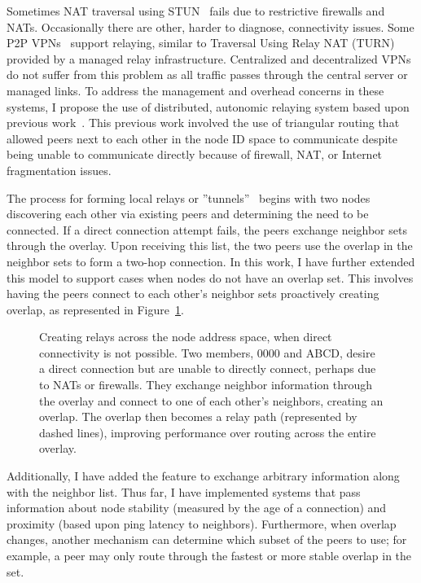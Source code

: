 Sometimes NAT traversal using STUN~\cite{stun} fails due to restrictive
firewalls and NATs.  Occasionally there are other, harder to diagnose,
connectivity issues.  Some P2P VPNs~\cite{hamachi, gbridge} support relaying,
similar to Traversal Using Relay NAT (TURN)~\cite{turn} provided by a managed
relay infrastructure.  Centralized and decentralized VPNs do not suffer from
this problem as all traffic passes through the central server or managed links.
To address the management and overhead concerns in these systems, I propose the
use of distributed, autonomic relaying system based upon previous
work~\cite{hpdc08_0,epost}.  This previous work involved the use of triangular
routing that allowed peers next to each other in the node ID space to
communicate despite being unable to communicate directly because of firewall,
NAT, or Internet fragmentation issues.

The process for forming local relays or ''tunnels''~\cite{hpdc08_0} begins with
two nodes discovering each other via existing peers and determining the need to
be connected.  If a direct connection attempt fails, the peers exchange
neighbor sets through the overlay.  Upon receiving this list, the two peers use
the overlap in the neighbor sets to form a two-hop connection.  In this work, I
have further extended this model to support cases when nodes do not have an
overlap set.  This involves having the peers connect to each other's neighbor
sets proactively creating overlap, as represented in Figure~\ref{fig:relay}.

\begin{figure}[ht]
\centering
{}
\caption[Motivation for relays]{Creating relays across the node address space,
when direct connectivity is not possible.  Two members, 0000 and ABCD,  desire
a direct connection but are unable to directly connect, perhaps due to NATs or
firewalls.  They exchange neighbor information through the overlay and connect
to one of each other's neighbors, creating an overlap.  The overlap then
becomes a relay path (represented by dashed lines), improving performance over
routing across the entire overlay.}
\label{fig:relay}
\end{figure}

Additionally, I have added the feature to exchange arbitrary information along
with the neighbor list.  Thus far, I have implemented systems that pass
information about node stability (measured by the age of a connection) and
proximity (based upon ping latency to neighbors).  Furthermore, when overlap
changes, another mechanism can determine which subset of the peers to use; for
example, a peer may only route through the fastest or more stable overlap in
the set.

